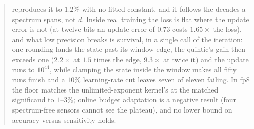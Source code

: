 \begin{abstract}
reproduces it to $1.2\%$ with no fitted constant, and it follows the decades a spectrum
spans, not $d$.
Inside real training the loss is flat where the update error is not (at twelve bits an
update error of $0.73$ costs $1.65\times$ the loss), and what low precision breaks is
survival, in a single call of the iteration: one rounding lands the state past its window
edge, the quintic's gain then exceeds one ($2.2\times$ at $1.5$ times the edge, $9.3\times$
at twice it) and the update runs to $10^{44}$, while clamping the state inside the window
makes all fifty runs finish and a $10\%$ learning-rate cut leaves seven of eleven failing.
In fp8 the floor matches the unlimited-exponent kernel's at the matched significand to
$1$--$3\%$; online budget adaptation is a negative result (four spectrum-free sensors
cannot see the plateau), and no lower bound on accuracy versus sensitivity holds.
\end{abstract}
